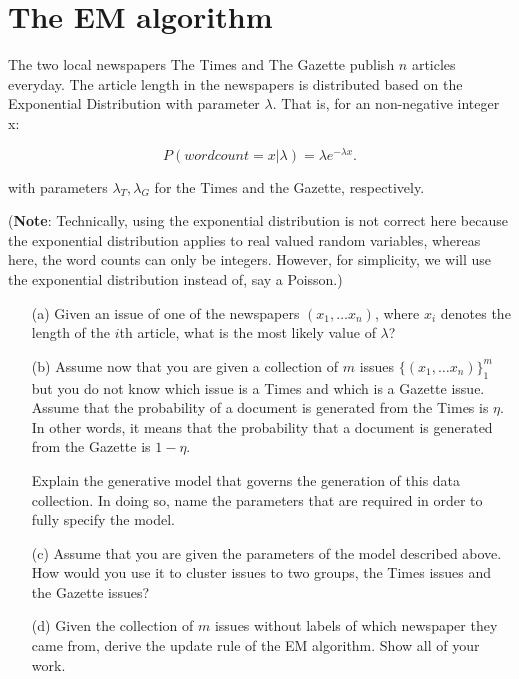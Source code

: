 \section{The EM algorithm}

The two local newspapers The Times and The Gazette publish $n$
articles everyday. The article length in the newspapers is distributed
based on the Exponential Distribution with parameter $\lambda$. That
is, for an non-negative integer x:

\[ P(wordcount = x| \lambda)=\lambda e^{-\lambda x}. \]

with parameters $\lambda_T, \lambda_G$ for the Times and the Gazette,
respectively.

({\bf Note}: Technically, using the exponential distribution is not
correct here because the exponential distribution applies to real
valued random variables, whereas here, the word counts can only be
integers. However, for simplicity, we will use the exponential
distribution instead of, say a Poisson.)

\begin{enumerate}
\item[(a)] Given an issue of one of the newspapers $(x_1,\ldots
   x_n)$, where $x_i$ denotes the length of the $i$th
   article, what is the most likely value of $\lambda$?


 \item[(b)] Assume now that you are given a collection of $m$ issues
   $\{(x_1,\ldots x_n)\}_1^m$ but you do not know which issue is a
   Times and which is a Gazette issue. Assume that the probability of
   a document is generated from the Times is $\eta$. In other words,
   it means that the probability that a document is generated from the
   Gazette is $1-\eta$.


   Explain the generative model that governs the generation of this
   data collection. In doing so, name the parameters that are required
   in order to fully specify the model.


 \item[(c)] Assume that you are given the parameters of the model
   described above. How would you use it to cluster issues to two
   groups, the Times issues and the Gazette issues?

 \item[(d)] Given the collection of $m$ issues without labels of which
   newspaper they came from, derive the update rule of the EM
   algorithm. Show all of your work.

\end{enumerate}

